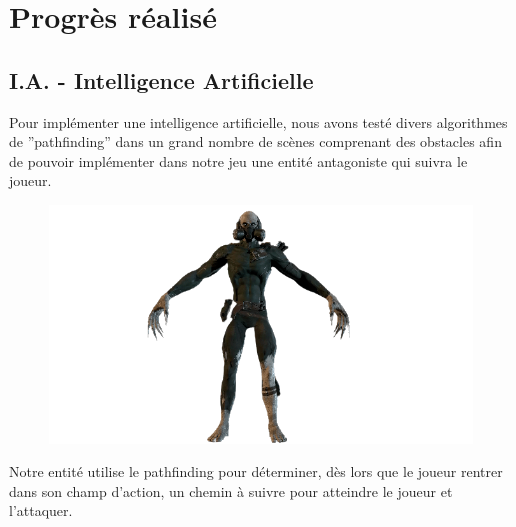 \section{Progrès réalisé}

\subsection{I.A. - Intelligence Artificielle}
\setlength{\parindent}{5ex}
Pour implémenter une intelligence artificielle, nous avons testé divers algorithmes de ''pathfinding'' dans un grand nombre de scènes comprenant des obstacles afin de pouvoir implémenter dans notre jeu une entité antagoniste qui suivra le joueur.

\begin{figure}[H]
\centering
\begin{minipage}{.5\textwidth}
  \centering
  \centerline{\includegraphics[width=1\linewidth]{img/assets/sterven.png}}
  \label{fig:méchant}
\end{minipage}%
\end{figure}

Notre entité utilise le pathfinding pour déterminer, dès lors que le joueur rentrer dans son champ d'action, un chemin à suivre pour atteindre le joueur et l'attaquer.


